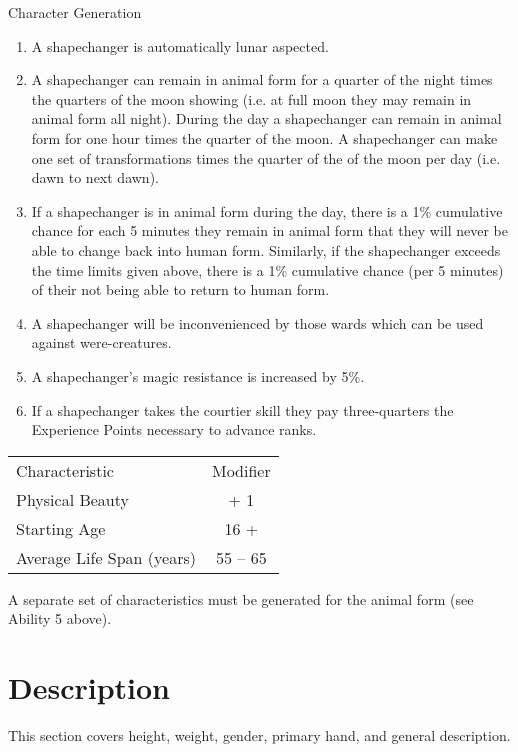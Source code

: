 \begin{Chapter}{Character Generation}
\begin{enumerate}
\item A shapechanger is automatically lunar aspected.

\item A shapechanger can remain in animal form for a quarter of the
  night times the quarters of the moon showing (i.e. at full moon they
  may remain in animal form all night).  During the day a shapechanger
  can remain in animal form for one hour times the quarter of the
  moon.  A shapechanger can make one set of transformations times the
  quarter of the of the moon per day (i.e. dawn to next dawn).

\item If a shapechanger is in animal form during the day, there is a
  1\% cumulative chance for each 5 minutes they remain in animal form
  that they will never be able to change back into human form.
  Similarly, if the shapechanger exceeds the time limits given above,
  there is a 1\% cumulative chance (per 5 minutes) of their not being
  able to return to human form.

\item A shapechanger will be inconvenienced by those wards which can
  be used against were-creatures.

\item A shapechanger’s magic resistance is increased by 5\%.

\item If a shapechanger takes the courtier skill they pay
  three-quarters the Experience Points necessary to advance ranks.

\end{enumerate}

\begin{tabularx}{\columnwidth}{Xc}
Characteristic			& Modifier \\
Physical Beauty			& + 1 \\
Starting Age			& 16 +  \\
Average Life Span (years)	& 55 -- 65 \\
\end{tabularx}

A separate set of characteristics must be generated for the animal
form (see Ability 5 above).

\section{Description}
\label{description}

This section covers height, weight, gender, primary hand, and general
description.


\end{Chapter}
